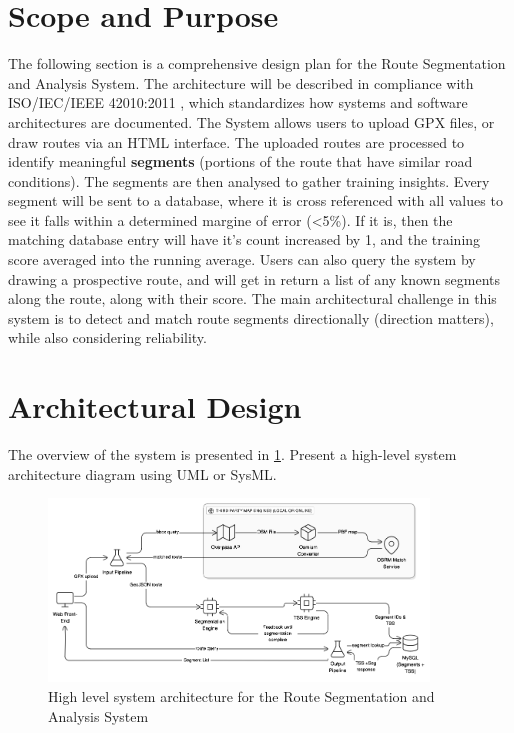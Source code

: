 \documentclass[11pt,twoside]{report}
\begin{document}
\section{Scope and Purpose}
The following section is a comprehensive design plan for the Route Segmentation and Analysis System.
The architecture will be described in compliance with ISO/IEC/IEEE 42010:2011 \citep{ISO42010}, which standardizes how systems
and software architectures are documented.
The System allows users to upload GPX files, or draw routes via an HTML interface. The uploaded routes are processed to
identify meaningful \textbf{segments} (portions of the route that have similar road conditions). The segments are then analysed to
gather training insights. Every segment will be sent to a database, where it is cross referenced with all values to see it falls within a determined
margine of error (<5\%). If it is, then the matching database entry will have it's count increased by 1, and the training score averaged into the running average.
Users can also query the system by drawing a prospective route, and will get in return a list of any known segments along the route, along with their
score. The main architectural challenge in this system is to detect and match route segments directionally (direction matters), while also considering
reliability.
\section{Architectural Design}
The overview of the system is presented in \ref{fig:archdiagram}.
Present a high-level system architecture diagram using UML or SysML.

\begin{figure}[htbp!]
	\centering
	\includegraphics[width=0.9\textwidth]{archdiagram.png}
	\caption {High level system architecture for the Route Segmentation and Analysis System}
	\label{fig:archdiagram}
\end{figure}
\end{document}
